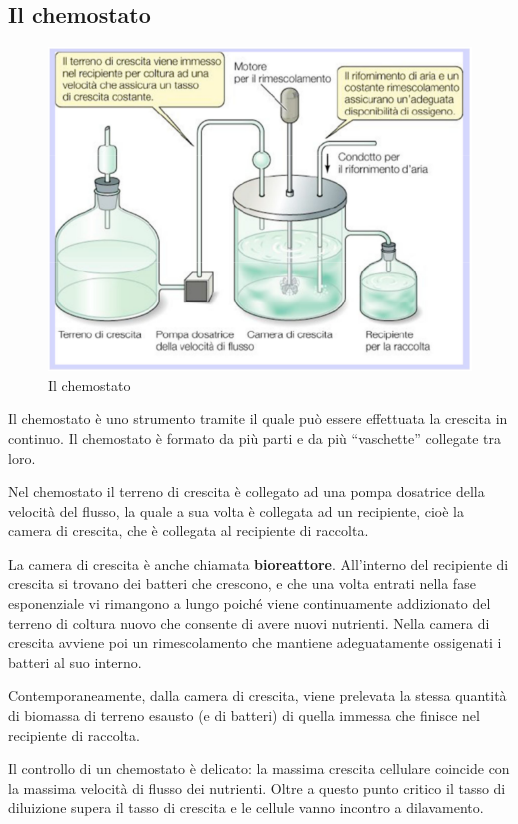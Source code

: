 \documentclass[11pt]{book}
\begin{document}
\clearpage
\subsection{Il chemostato}
\begin{figure}[htp]
\centering
\includegraphics[scale=0.5]{img/Chemostato.png}
\caption{Il chemostato}
\label{}
\end{figure}

Il chemostato è uno strumento tramite il quale può essere effettuata la crescita in continuo. Il chemostato è formato da più parti e da più ``vaschette'' collegate tra loro.

Nel chemostato il terreno di crescita è collegato ad una pompa dosatrice della velocità del flusso, la quale a sua volta è collegata ad un recipiente, cioè la camera di crescita, che è collegata al recipiente di raccolta.

La camera di crescita è anche chiamata \textbf{bioreattore}. All’interno del recipiente di crescita si trovano dei batteri che crescono, e che una volta entrati nella fase esponenziale vi rimangono a lungo poiché viene continuamente addizionato del terreno di coltura nuovo che consente di avere nuovi nutrienti. Nella camera di crescita avviene poi un rimescolamento che mantiene adeguatamente ossigenati i batteri al suo interno.

Contemporaneamente, dalla camera di crescita, viene prelevata la stessa quantità di biomassa di terreno esausto (e di batteri) di quella immessa che finisce nel recipiente di raccolta.

Il controllo di un chemostato è delicato: la massima crescita cellulare coincide con la massima velocità di flusso dei nutrienti. Oltre a questo punto critico il tasso di diluizione supera il tasso di crescita e le cellule vanno incontro a dilavamento.
\end{document}

